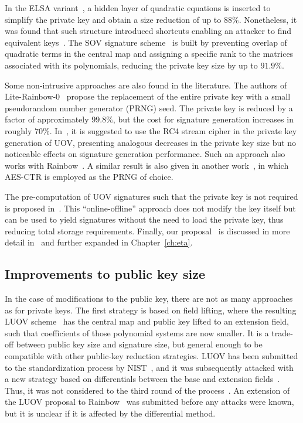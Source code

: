 \documentclass[english]{ufsc-thesis-rn46-2019/ufsc-thesis-rn46-2019}
\theoremstyle{definition}
\begin{document}
In the ELSA variant~\cite{Shim:201712}, a hidden layer of quadratic equations
is inserted to simplify the private key and obtain a size reduction of up to
$88\%$. Nonetheless, it was found that such structure introduced shortcuts
enabling an attacker to find equivalent keys~\cite{Hashimoto:201909}. The SOV
signature scheme~\cite{Shim:202001} is built by preventing overlap of quadratic
terms in the central map and assigning a specific rank to the matrices
associated with its polynomials, reducing the private key size by up to
$91.9\%$.

Some non-intrusive approaches are also found in the literature. The authors of
Lite-Rainbow-0~\cite{Shim:201512} propose the replacement of the entire private
key with a small pseudorandom number generator (PRNG) seed. The private key is
reduced by a factor of approximately $99.8\%$, but the cost for signature
generation increases in roughly $70\%$. In~\cite{Borges:201209}, it is
suggested to use the RC4 stream cipher in the private key generation of UOV,
presenting analogous decreases in the private key size but no noticeable
effects on signature generation performance. Such an approach also works with
Rainbow~\cite{Dornelles:201910}. A similar result is also given in another
work~\cite{Seo:201403}, in which AES-CTR is employed as the PRNG of choice.

The pre-computation of UOV signatures such that the private key is not required
is proposed in~\cite{Chen:201603}. This ``online-offline'' approach does not
modify the key itself but can be used to yield signatures without the need to
load the private key, thus reducing total storage requirements. Finally, our
proposal~\cite{Zambonin:201907} is discussed in more detail
in~\cite{Bittencourt:201911} and further expanded in Chapter~\ref{ch:eta}.

\subsection{Improvements to public key size}\label{subsec:pub}

In the case of modifications to the public key, there are not as many
approaches as for private keys. The first strategy is based on field lifting,
where the resulting LUOV scheme~\cite{Beullens:201712} has the central map and
public key lifted to an extension field, such that coefficients of those
polynomial systems are now smaller. It is a trade-off between public key size
and signature size, but general enough to be compatible with other public-key
reduction strategies. LUOV has been submitted to the standardization process by
NIST~\cite{Alagic:201901}, and it was subsequently attacked with a new strategy
based on differentials between the base and extension
fields~\cite{Ding:202008}. Thus, it was not considered to the third round of
the process~\cite[Sec.~3.24]{Alagic:202007}. An extension of the LUOV proposal
to Rainbow~\cite{Duong:202003} was submitted before any attacks were known, but
it is unclear if it is affected by the differential method.
\end{document}
